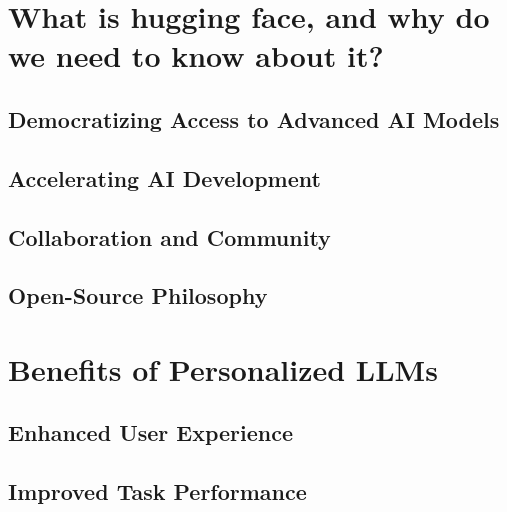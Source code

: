 \documentclass[
]{book}
\begin{document}
\hypertarget{what-is-hugging-face-and-why-do-we-need-to-know-about-it}{%
\section{What is hugging face, and why do we need to know about it?}\label{what-is-hugging-face-and-why-do-we-need-to-know-about-it}}

\hypertarget{democratizing-access-to-advanced-ai-models}{%
\subsection{Democratizing Access to Advanced AI Models}\label{democratizing-access-to-advanced-ai-models}}

\hypertarget{accelerating-ai-development}{%
\subsection{Accelerating AI Development}\label{accelerating-ai-development}}

\hypertarget{collaboration-and-community}{%
\subsection{Collaboration and Community}\label{collaboration-and-community}}

\hypertarget{open-source-philosophy}{%
\subsection{Open-Source Philosophy}\label{open-source-philosophy}}

\hypertarget{benefits-of-personalized-llms}{%
\section{Benefits of Personalized LLMs}\label{benefits-of-personalized-llms}}

\hypertarget{enhanced-user-experience}{%
\subsection{Enhanced User Experience}\label{enhanced-user-experience}}

\hypertarget{improved-task-performance}{%
\subsection{Improved Task Performance}\label{improved-task-performance}}
\end{document}
